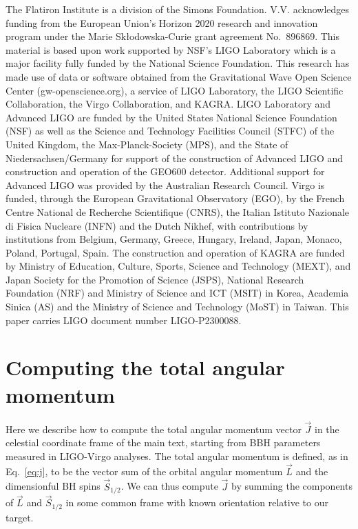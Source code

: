 \documentclass[aps,prd,twocolumn,superscriptaddress,preprintnumbers,floatfix,nofootinbib]{revtex4-2}
\newcommand{\dcc}{LIGO-P2300088}
\begin{document}
\begin{acknowledgments}
The Flatiron Institute is a division of the Simons Foundation.
V.V. acknowledges funding from the European Union's Horizon 2020 research and
innovation program under the Marie Skłodowska-Curie grant agreement No.~896869.
This material is based upon work supported by NSF's LIGO Laboratory which is a major facility fully funded by the National Science Foundation.
This research has made use of data or software obtained from the Gravitational Wave Open Science Center (gw-openscience.org), a service of LIGO Laboratory, the LIGO Scientific Collaboration, the Virgo Collaboration, and KAGRA. LIGO Laboratory and Advanced LIGO are funded by the United States National Science Foundation (NSF) as well as the Science and Technology Facilities Council (STFC) of the United Kingdom, the Max-Planck-Society (MPS), and the State of Niedersachsen/Germany for support of the construction of Advanced LIGO and construction and operation of the GEO600 detector. Additional support for Advanced LIGO was provided by the Australian Research Council. Virgo is funded, through the European Gravitational Observatory (EGO), by the French Centre National de Recherche Scientifique (CNRS), the Italian Istituto Nazionale di Fisica Nucleare (INFN) and the Dutch Nikhef, with contributions by institutions from Belgium, Germany, Greece, Hungary, Ireland, Japan, Monaco, Poland, Portugal, Spain. The construction and operation of KAGRA are funded by Ministry of Education, Culture, Sports, Science and Technology (MEXT), and Japan Society for the Promotion of Science (JSPS), National Research Foundation (NRF) and Ministry of Science and ICT (MSIT) in Korea, Academia Sinica (AS) and the Ministry of Science and Technology (MoST) in Taiwan.
This paper carries LIGO document number \dcc{}.
\end{acknowledgments}

\appendix

\section{Computing the total angular momentum}
\label{app:j}

Here we describe how to compute the total angular momentum vector $\vec{J}$ in the celestial coordinate frame of the main text, starting from \ac{BBH} parameters measured in LIGO-Virgo analyses.
The total angular momentum is defined, as in Eq.~\eqref{eq:j}, to be the vector sum of the orbital angular momentum $\vec{L}$ and the dimensionful \ac{BH} spins $\vec{S}_{1/2}$.
We can thus compute $\vec{J}$ by summing the components of $\vec{L}$ and $\vec{S}_{1/2}$ in some common frame with known orientation relative to our target.
\end{document}
